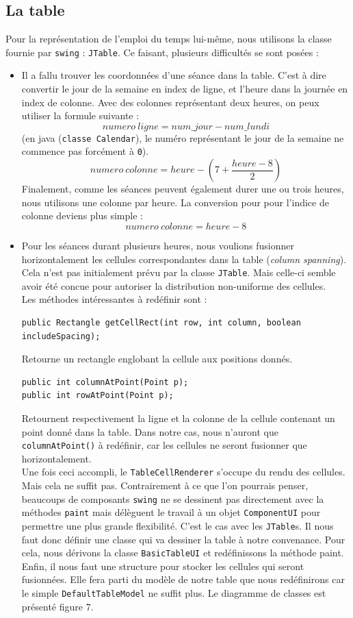 \documentclass{article}
\begin{document}
\newpage
\subsection{La table}
Pour la représentation de l'emploi du temps lui-même, nous utilisons la classe fournie par \texttt{swing} : \texttt{JTable}. Ce faisant, plusieurs difficultés se sont posées :
\begin{itemize}
\item Il a fallu trouver les coordonnées d'une séance dans la table. C'est à dire convertir le jour de la semaine en index de ligne, et l'heure dans la journée en index de colonne.
Avec des colonnes représentant deux heures, on peux utiliser la formule suivante :
\[numero\ ligne = num\_jour - num\_lundi\] (en java (\texttt{classe Calendar}), le numéro représentant le jour de la semaine ne commence pas forcément à \texttt{0}).
\[numero\ colonne = heure - (7 + \frac{heure - 8}{2})\]
Finalement, comme les séances peuvent également durer une ou trois heures, nous utilisons une colonne par heure. La conversion pour pour l'indice de colonne deviens plus simple :
\[numero\ colonne = heure - 8\]
\item Pour les séances durant plusieurs heures, nous voulions fusionner horizontalement les cellules correspondantes dans la table (\textit{column spanning}).
Cela n'est pas initialement prévu par la classe \texttt{JTable}. Mais celle-ci semble avoir été concue pour autoriser la distribution non-uniforme des cellules.\\
Les méthodes intéressantes à redéfinir sont :
\begin{verbatim}
public Rectangle getCellRect(int row, int column, boolean includeSpacing);
\end{verbatim}
Retourne un rectangle englobant la cellule aux positions donnés.
\begin{verbatim}
public int columnAtPoint(Point p);
public int rowAtPoint(Point p);
\end{verbatim}
Retournent respectivement la ligne et la colonne de la cellule contenant un point donné dans la table. Dans notre cas, nous n'auront que \texttt{columnAtPoint()} à redéfinir, car les cellules ne seront fusionner que horizontalement.\\
Une fois ceci accompli, le \texttt{TableCellRenderer} s'occupe du rendu des cellules. \\
Mais cela ne suffit pas. Contrairement à ce que l'on pourrais penser, beaucoups de composants \texttt{swing} ne se dessinent pas directement avec la méthodes \texttt{paint} mais délèguent le travail à un objet \texttt{ComponentUI} pour permettre une plus grande flexibilité. C'est le cas avec les \texttt{JTable}s. Il nous faut donc définir une classe qui va dessiner la table à notre convenance. Pour cela, nous dérivons la classe \texttt{BasicTableUI} et redéfinissons la méthode paint. \\
Enfin, il nous faut une structure pour stocker les cellules qui seront fusionnées. Elle fera parti du modèle de notre table que nous redéfinirons car le simple \texttt{DefaultTableModel} ne suffit plus.
Le diagramme de classes est présenté figure 7.


\end{itemize}
\end{document}
